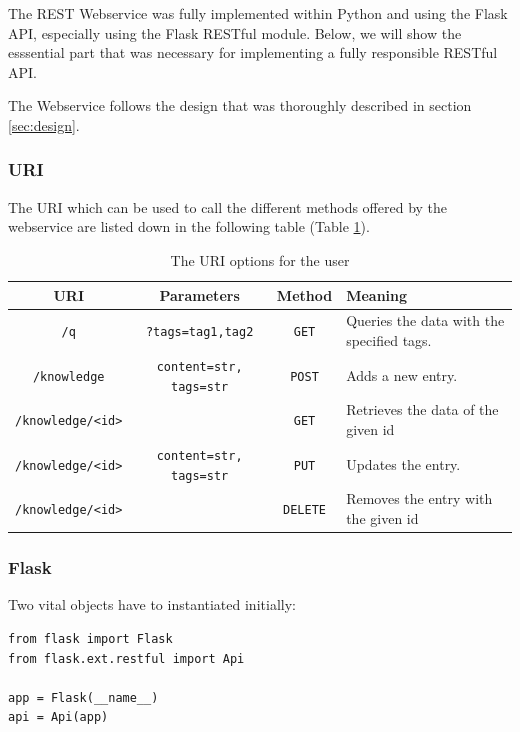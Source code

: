 \documentclass[11pt, a4paper]{article}
\begin{document}
The REST Webservice was fully implemented within Python and using the Flask API,
especially using the Flask RESTful module. Below, we will show the esssential
part that was necessary for implementing a fully responsible RESTful API.  

The Webservice follows the design that was thoroughly described in section
\ref{sec:design}.

\subsubsection{URI}

The URI which can be used to call the different methods offered by the
webservice are listed down in the following table (Table \ref{tab:uri}).

\begin{table}[htbp]
  \centering
  \begin{tabular}{| c | c | c | l | } \hline
    \textbf{URI} & \textbf{Parameters} & \textbf{Method} & \textbf{Meaning} \\ \hline
    \lstinline|/q| & \lstinline|?tags=tag1,tag2| & \lstinline|GET| & Queries the data with the specified tags.  \\ \hline
    \lstinline|/knowledge| & \lstinline|content=str, tags=str| & \lstinline|POST| & Adds a new entry. \\ \hline
    \lstinline|/knowledge/<id>| &  & \lstinline|GET| & Retrieves the data of the given id  \\ \hline
    \lstinline|/knowledge/<id>| & \lstinline|content=str, tags=str| & \lstinline|PUT| & Updates the entry.   \\ \hline
    \lstinline|/knowledge/<id>| &  & \lstinline|DELETE| & Removes the entry with the given id \\ \hline
  \end{tabular}
  \caption{The URI options for the user}
  \label{tab:uri}
\end{table}

\subsubsection{Flask}

Two vital objects have to instantiated initially: 

\begin{lstlisting}
from flask import Flask
from flask.ext.restful import Api

app = Flask(__name__)
api = Api(app)
\end{lstlisting}
\vspace{10pt}
\end{document}
